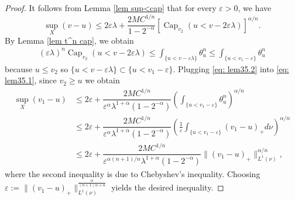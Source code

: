 \documentclass[10pt,a4paper]{amsart}
\newcommand{\capacity}{\mathop{\mathrm{Cap}}\nolimits}
\begin{document}
\begin{proof}
	It follows from Lemma \ref{lem sup<cap} that for every $\varepsilon>0$, we have
	\begin{equation}\label{eq: lem35.1}
	\sup_X(v-u)\leq 2\varepsilon\lambda+\dfrac{2 M C^{1/n}}{1-2^{-\alpha}}[\capacity_{v_2}(u<v-2\varepsilon\lambda)]^{\alpha/n}.
    \end{equation}
	By Lemma \ref{lem t^n cap}, we obtain
		\begin{equation}\label{eq: lem35.2}
		    \begin{split}
		        (\varepsilon\lambda)^n\capacity_{v_2}(u<v-2\varepsilon\lambda)\leq \int_{\{u<v-\varepsilon\lambda\}}\theta_u^n\leq \int_{\{u<v_1-\varepsilon\}}\theta_u^n
		    \end{split}
		\end{equation} because $u\leq v_2$ so $\{u<v-\varepsilon\lambda\}\subset\{u<v_1-\varepsilon\}$. 
   Plugging \eqref{eq: lem35.2} into \eqref{eq: lem35.1}, since $v_2\geq u$ we obtain     
        \begin{align*}
		    \sup_X(v_1-u)&\leq 
2\varepsilon+\dfrac{2 M C^{1/n}}{\varepsilon^{\alpha}\lambda^{1+\alpha} (1-2^{-\alpha})}\left(\int_{\{u<v_1-\varepsilon\}}\theta_u^n\right)^{\alpha/n}
\\
&\leq 2\varepsilon+\dfrac{2 M C^{1/n}}{\varepsilon^{\alpha}\lambda^{1+\alpha} (1-2^{-\alpha}) }\left(\frac{1}{\varepsilon}\int_{\{u<v_1-\varepsilon\}}(v_1-u)_+d\nu\right)^{\alpha/n} \\
&\leq  2\varepsilon+\dfrac{2 M C^{1/n}}{\varepsilon^{\alpha(n+1)/n}\lambda^{1+\alpha}(1-2^{-\alpha}) }\|(v_1-u)_+\|_{L^1(\nu)}^{\alpha/n},
		\end{align*} 
        where the second inequality is due to Chebyshev’s inequality.
Choosing $\varepsilon:=\|(v_1-u)_+\|_{L^1(\nu)}^{\frac{\alpha}{(n+1)\alpha+n}}$ yields the desired inequality.
\end{proof}
\end{document}
